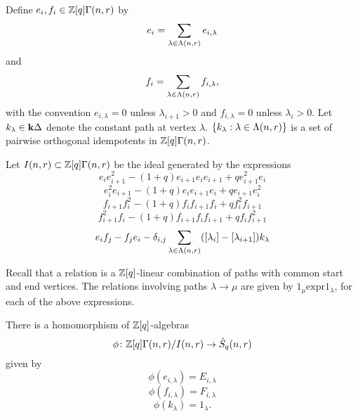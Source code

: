 \documentclass[a4paper, 11pt]{report}
\begin{document}
Define $e_i, f_i\in\mathbb{Z}[q]\Gamma(n,r)$ by
\begin{equation*}
e_i = \sum_{\lambda\in\Lambda(n,r)} e_{i,\lambda}
\end{equation*}
and
\begin{equation*}
f_i = \sum_{\lambda\in\Lambda(n,r)} f_{i,\lambda},
\end{equation*}
with the convention $e_{i,\lambda} = 0$ unless $\lambda_{i+1}>0$ and $f_{i,\lambda} = 0$ unless $\lambda_i>0$. Let $k_\lambda\in\mathbf{k}\Delta$ denote the constant path at vertex $\lambda$. $\{k_\lambda:\lambda\in\Lambda(n,r)\}$ is a set of pairwise orthogonal idempotents in $\mathbb{Z}[q]\Gamma(n,r)$.

Let $I(n,r)\subset\mathbb{Z}[q]\Gamma(n,r)$ be the ideal generated by the expressions
\begin{equation*}
e_i e_{i+1}^2 -(1+q)e_{i+1}e_ie_{i+1} + qe_{i+1}^2e_i
\end{equation*}
\begin{equation*}
e_i^2e_{i+1} - (1+q) e_ie_{i+1}e_i + qe_{i+1}e_i^2
\end{equation*}
\begin{equation*}
f_{i+1}f_i^2 - (1+q)f_if_{i+1} f_i + qf_i^2f_{i+1}
\end{equation*}
\begin{equation*}
f_{i+1}^2f_i - (1+q)f_{i+1}f_if_{i+1} + qf_if_{i+1}^2
\end{equation*}
\begin{equation*}
e_if_j - f_je_i - \delta_{i,j} \sum_{\lambda\in\Lambda(n,r)} ([\lambda_i]-[\lambda_{i+1}])k_\lambda
\end{equation*}

Recall that a relation is a $\mathbb{Z}[q]$-linear combination of paths with common start and end vertices. The relations involving paths $\lambda\to\mu$ are given by $1_\mu \text{expr} 1_\lambda$, for each of the above expressions.

\begin{lemma}
There is a homomorphism of $\mathbb{Z}[q]$-algebras
\begin{equation*}
\phi\colon\mathbb{Z}[q]\Gamma(n,r)/{I(n,r)}\to\hat{S}_q(n,r)
\end{equation*}
given by
\begin{equation*}
\phi(e_{i,\lambda}) = E_{i,\lambda}
\end{equation*}
\begin{equation*}
\phi(f_{i,\lambda}) = F_{i,\lambda}
\end{equation*}
\begin{equation*}
\phi(k_\lambda) = 1_\lambda.
\end{equation*}
\end{lemma}
\end{document}
